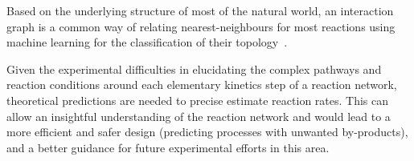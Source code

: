 Based on the underlying structure of most of the natural world,
an interaction graph is a common way of relating
nearest-neighbours for most reactions using machine learning
for the classification of their topology~\cite{Simm_2016}.

Given the experimental difficulties in elucidating the complex pathways and reaction conditions around each elementary kinetics step of a reaction network,
theoretical predictions are needed to precise estimate reaction rates.
This can allow an insightful understanding of the reaction network and would lead to a more efficient and safer design (predicting processes with unwanted by-products),
and a better guidance for future experimental efforts in this area.

